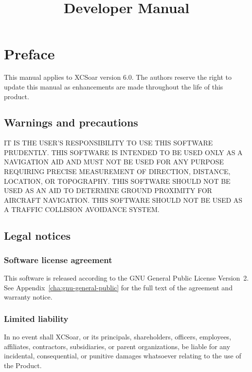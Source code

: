 \documentclass[a4paper,12pt]{refrep}
\title{Developer Manual}
\begin{document}
\maketitle

\begingroup
\setlength{\parskip}{0.1\baselineskip}
\tableofcontents
\endgroup


\chapter*{Preface}

This manual applies to XCSoar version 6.0.  The authors reserve the
right to update this manual as enhancements are made throughout the
life of this product.

\section*{Warnings and precautions}

\warning IT IS THE USER'S RESPONSIBILITY TO USE THIS SOFTWARE PRUDENTLY. THIS
SOFTWARE IS INTENDED TO BE USED ONLY AS A NAVIGATION AID AND MUST NOT
BE USED FOR ANY PURPOSE REQUIRING PRECISE MEASUREMENT OF DIRECTION,
DISTANCE, LOCATION, OR TOPOGRAPHY. THIS SOFTWARE SHOULD NOT BE USED AS
AN AID TO DETERMINE GROUND PROXIMITY FOR AIRCRAFT NAVIGATION.
THIS SOFTWARE SHOULD NOT BE USED AS A TRAFFIC COLLISION AVOIDANCE SYSTEM.


\section*{Legal notices}

\subsection*{Software license agreement}

This software is released according to the GNU General Public License
Version~2.  See Appendix~\ref{cha:gnu-general-public} for the full
text of the agreement and warranty notice.

\subsection*{Limited liability}

In no event shall XCSoar, or its principals, shareholders, officers,
employees, affiliates, contractors, subsidiaries, or parent
organizations, be liable for any incidental, consequential, or
punitive damages whatsoever relating to the use of the Product.
\end{document}
